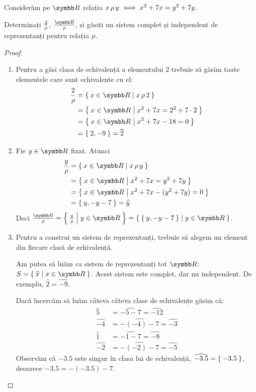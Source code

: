 \begin{exercise}
Considerăm pe \(\reals\) relația \(x \operatorname{\rho} y \iff x^2 + 7x = y^2 + 7y\).

Determinați \(\frac{2}{\operatorname{\rho}}\), \(\frac{\reals}{\rhoequiv}\), și găsiți un sistem complet și independent de reprezentanți pentru relația \(\operatorname{\rho}\).
\end{exercise}
\begin{proof}
~
\begin{enumerate}
    \item Pentru a găsi clasa de echivalență a elementului \(2\) trebuie să găsim toate elementele care sunt echivalente cu el: \begin{align*}
        \frac{2}{\rhoequiv} &= \Set{ x \in \reals | x \rhoequiv 2 } \\
        &= \Set{ x \in \reals | x^2 + 7x = 2^2 + 7 \cdot 2 } \\
        &= \Set{ x \in \reals | x^2 + 7x - 18 = 0 } \\
        &= \Set{ 2, - 9 } = \widehat{2}
    \end{align*}
    \item Fie \(y \in \reals\) fixat. Atunci \begin{align*}
        \frac{y}{\rhoequiv} &= \Set{ x \in \reals | x \rhoequiv y } \\
        &= \Set{ x \in \reals | x^2 + 7x = y^2 + 7y } \\
        &= \Set{ x \in \reals | x^2 + 7x - (y^2 + 7y) = 0 } \\
        &= \Set{ y, - y - 7 } = \widehat{y}
    \end{align*}
    Deci \(\frac{\reals}{\rho} = \Set{ \frac{y}{\rho} | y \in \reals } = \Set{ \Set{ y, - y - 7} | y \in \reals }\).
    \item Pentru a construi un sistem de reprezentanți, trebuie să alegem un element din fiecare clasă de echivalență.

    Am putea să luăm ca sistem de reprezentanți tot \(\reals\): \(S = \Set{ \widehat{x} | x \in \reals }\). Acest sistem este complet, dar nu independent. De exemplu, \(\widehat{2} = \widehat{-9}\).

    Dacă încercăm să luăm câteva câteva clase de echivalențe găsim că:
    \begin{align*}
        \widehat{5} &= \widehat{-5 - 7} = \widehat{- 12} \\
        \widehat{-4} &= \widehat{- (-4) - 7} = \widehat{-3} \\
        \widehat{1} &= \widehat{-1 - 7} = \widehat{-8} \\
        \widehat{-2} &= \widehat{- (-2) -7} = \widehat{-5}
    \end{align*}
    Observăm că \(-3.5\) este singur în clasa lui de echivalență, \(\widehat{-3.5} = \Set{ -3.5 }\), deoarece \(-3.5 = - (-3.5) - 7\).


\end{enumerate}
\end{proof}
